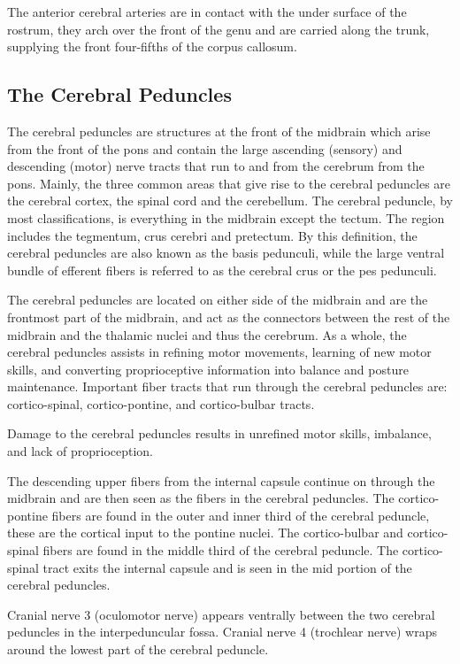 The anterior cerebral arteries are in contact with the under surface of the rostrum, they arch over the front of the genu and are carried along the trunk, supplying the front four-fifths of the corpus callosum.

\hypertarget{the-cerebral-peduncles}{%
\subsection{The Cerebral Peduncles}\label{the-cerebral-peduncles}}

The cerebral peduncles are structures at the front of the midbrain which arise from the front of the pons and contain the large ascending (sensory) and descending (motor) nerve tracts that run to and from the cerebrum from the pons. Mainly, the three common areas that give rise to the cerebral peduncles are the cerebral cortex, the spinal cord and the cerebellum. The cerebral peduncle, by most classifications, is everything in the midbrain except the tectum. The region includes the tegmentum, crus cerebri and pretectum. By this definition, the cerebral peduncles are also known as the basis pedunculi, while the large ventral bundle of efferent fibers is referred to as the cerebral crus or the pes pedunculi.

The cerebral peduncles are located on either side of the midbrain and are the frontmost part of the midbrain, and act as the connectors between the rest of the midbrain and the thalamic nuclei and thus the cerebrum. As a whole, the cerebral peduncles assists in refining motor movements, learning of new motor skills, and converting proprioceptive information into balance and posture maintenance. Important fiber tracts that run through the cerebral peduncles are: cortico-spinal, cortico-pontine, and cortico-bulbar tracts.

Damage to the cerebral peduncles results in unrefined motor skills, imbalance, and lack of proprioception.

The descending upper fibers from the internal capsule continue on through the midbrain and are then seen as the fibers in the cerebral peduncles. The cortico-pontine fibers are found in the outer and inner third of the cerebral peduncle, these are the cortical input to the pontine nuclei. The cortico-bulbar and cortico-spinal fibers are found in the middle third of the cerebral peduncle. The cortico-spinal tract exits the internal capsule and is seen in the mid portion of the cerebral peduncles.

Cranial nerve 3 (oculomotor nerve) appears ventrally between the two cerebral peduncles in the interpeduncular fossa. Cranial nerve 4 (trochlear nerve) wraps around the lowest part of the cerebral peduncle.

